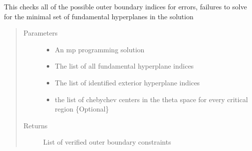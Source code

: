 \documentclass[letterpaper,10pt,english]{sphinxmanual}
\begin{document}
\begin{fulllineitems}
\label{\detokenize{mpo.upop:mpo.upop.upop_utils.verify_outer_boundary}}
\sphinxAtStartPar
This checks all of the possible outer boundary indices for errors, failures to solve for the minimal set of fundamental hyperplanes in the solution
\begin{quote}\begin{description}
\item[{Parameters}] \leavevmode\begin{itemize}
\item {} 
\sphinxAtStartPar
{} \textendash{} An mp programming solution

\item {} 
\sphinxAtStartPar
{} \textendash{} The list of all fundamental hyperplane indices

\item {} 
\sphinxAtStartPar
{} \textendash{} The list of identified exterior hyperplane indices

\item {} 
\sphinxAtStartPar
{} \textendash{} the list of chebychev centers in the theta space for every critical region \{Optional\}

\end{itemize}

\item[{Returns}] \leavevmode
\sphinxAtStartPar
List of verified outer boundary constraints

\end{description}\end{quote}

\end{fulllineitems}
\end{document}
